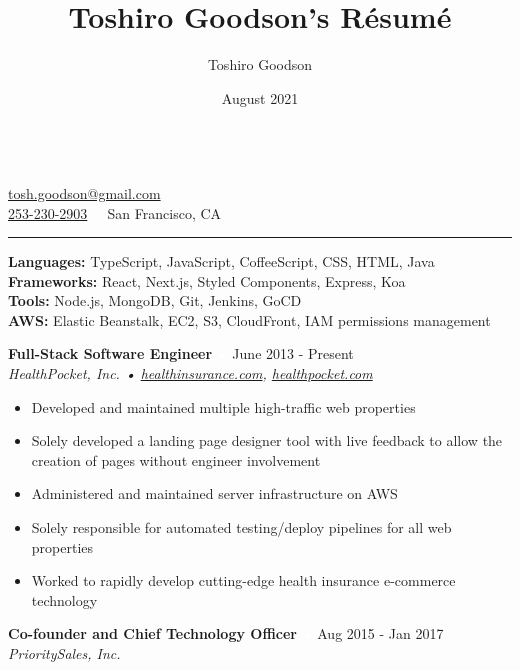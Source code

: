 \documentclass{resume}
\title{Toshiro Goodson's Résumé}
\author{Toshiro Goodson}
\date{August 2021}
\begin{document}
\color{content}
{\Large{}}\\
\href{mailto:tosh.goodson@gmail.com}{\color{content}tosh.goodson@gmail.com}\\
\href{tel:+12532302903}{\color{content}253-230-2903}
\hfill{\textcolor{white}{•}} %
\hfill{San Francisco, CA}

\nointerlineskip
\rule{\textwidth}{1pt}

\nointerlineskip
\colorbox{headerbg1}{\hspace{\linewidth}\hspace{-2\fboxsep}}

\textbf{Languages:} TypeScript, JavaScript, CoffeeScript, CSS, HTML, Java\\
\textbf{Frameworks:} React, Next.js, Styled Components, Express, Koa\\
\textbf{Tools:} Node.js, MongoDB, Git, Jenkins, GoCD\\
\textbf{AWS:} Elastic Beanstalk, EC2, S3, CloudFront, IAM permissions management

\bigskip

\colorbox{headerbg2}{\hspace{\linewidth}\hspace{-2\fboxsep}}

\textbf{Full-Stack Software Engineer}
\hfill{\textcolor{white}{•} June 2013 - Present}\\
\textit{HealthPocket, Inc. • \href{https://www.healthinsurance.com}{healthinsurance.com}, \href{https://www.healthpocket.com}{healthpocket.com}}

\nointerlineskip
\begin{itemize}
	\item Developed and maintained multiple high-traffic web properties
	\item Solely developed a landing page designer tool with live feedback to allow the creation of pages without engineer involvement
	\item Administered and maintained server infrastructure on AWS
	\item Solely responsible for automated testing/deploy pipelines for all web properties
	\item Worked to rapidly develop cutting-edge health insurance e-commerce technology
\end{itemize}

\textbf{Co-founder and Chief Technology Officer}
\hfill{\textcolor{white}{•} Aug 2015 - Jan 2017}\\
\textit{PrioritySales, Inc.}
\end{document}
